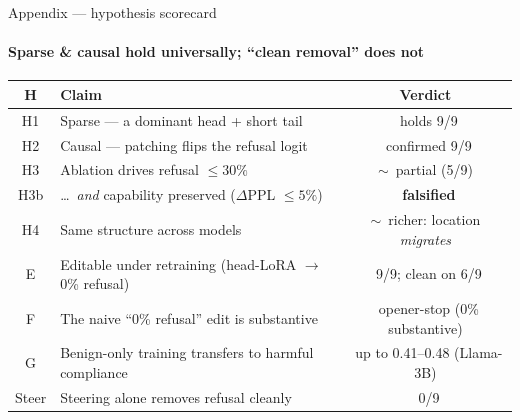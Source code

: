 \documentclass[aspectratio=169]{beamer}
\newcommand{\good}{\textcolor{themeblue!80!black}{\ding{51}}}
\newcommand{\bad}{\textcolor{red!70!black}{\ding{55}}}
\newcommand{\pmark}{\textcolor{themeorange!80!black}{$\sim$}}   %
\begin{document}
\begin{frame}{Appendix --- hypothesis scorecard}
  \framesubtitle{Sparse \& causal hold universally; ``clean removal'' does not}
  \scriptsize
  \renewcommand{\arraystretch}{1.25}
  \begin{tabular}{@{}c l c@{}}
    \toprule
    \textbf{H} & \textbf{Claim} & \textbf{Verdict} \\
    \midrule
    H1  & Sparse --- a dominant head + short tail                       & \good\ holds 9/9 \\
    H2  & Causal --- patching flips the refusal logit                   & \good\ confirmed 9/9 \\
    H3  & Ablation drives refusal $\le 30\%$                            & \pmark\ partial (5/9) \\
    H3b & \dots\ \emph{and} capability preserved ($\Delta$PPL $\le5\%$) & \bad\ \textbf{falsified} \\
    H4  & Same structure across models                                  & \pmark\ richer: location \emph{migrates} \\
    \midrule
    E   & Editable under retraining (head-LoRA $\rightarrow$ 0\% refusal) & \good\ 9/9; clean on 6/9 \\
    F   & The naive ``0\% refusal'' edit is substantive                & \bad\ opener-stop (0\% substantive) \\
    G   & Benign-only training transfers to harmful compliance          & \good\ up to 0.41--0.48 (Llama-3B) \\
    Steer & Steering alone removes refusal cleanly                      & \bad\ 0/9 \\
    \bottomrule
  \end{tabular}
\end{frame}
\end{document}
